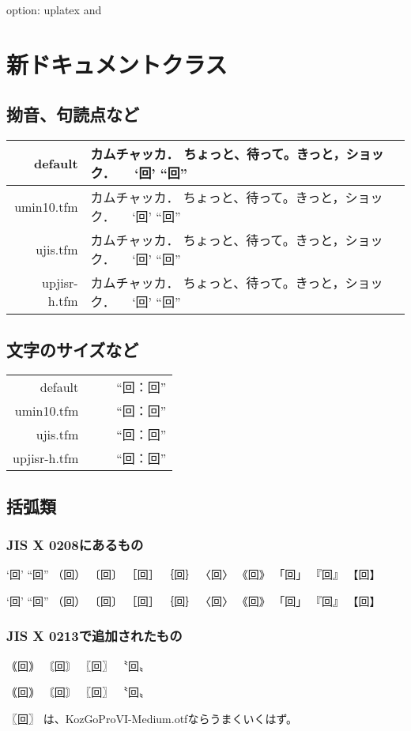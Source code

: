 \documentclass[uplatex]{\class}
\DeclareRobustCommand\umin{\kanjifamily{umin}\selectfont}
\DeclareRobustCommand\ujis{\kanjifamily{ujis}\selectfont}
\DeclareRobustCommand\upjisr{\kanjifamily{upjisr}\selectfont}
\begin{document}
option: uplatex and \option
\ifx\class\jsbook
\chapter{新ドキュメントクラス}
\fi
\section{拗音、句読点など}
\xdef\testtext{%
カムチャッカ．
ちょっと、待って。きっと，ショック．~~
‘回’ “回” }%
\begin{tabular}{rl}\hline
default & \testtext\\\hline

\if0
umin10.tfm &
{\umin \testtext}\\\hline

ujis.tfm &
{\ujis \testtext}\\\hline
\fi

upjisr-h.tfm &
{\upjisr \testtext}\\\hline

\end{tabular}

\section{文字のサイズなど}
\xdef\testtext{%
\frame{：}~~\frame{“}\frame{回}\frame{：}\frame{回}\frame{”}~~“回：回”}%

{\huge
\begin{tabular}{rl}
default & \testtext\\

\if0
umin10.tfm &
{\umin \testtext}\\

ujis.tfm &
{\ujis \testtext}\\
\fi

upjisr-h.tfm &
{\upjisr \testtext}\\

\end{tabular}
}

\section{括弧類}
\subsection{JIS X 0208にあるもの}
‘回’ “回” （回） 〔回〕 ［回］ ｛回｝ 〈回〉 《回》 「回」 『回』 【回】

{\gt
‘回’ “回” （回） 〔回〕 ［回］ ｛回｝ 〈回〉 《回》 「回」 『回』 【回】
}

\subsection{JIS X 0213で追加されたもの}
｟回｠ 〘回〙 〖回〗 〝回〟

{\gt
｟回｠ 〘回〙 〖回〗 〝回〟
}

{\gt 〖回〗} は、KozGoProVI-Medium.otfならうまくいくはず。
\end{document}
